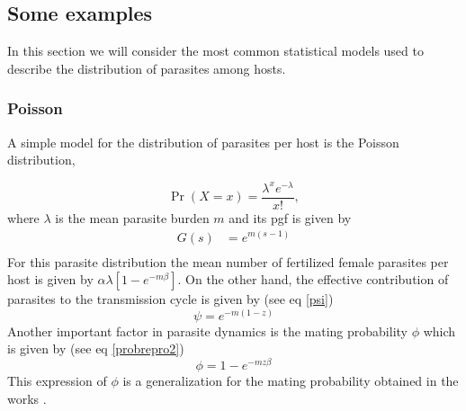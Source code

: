 \documentclass[12pt,a4paper]{article}
\theoremstyle{plain}%
\theoremstyle{definition}
\theoremstyle{remark}
\begin{document}
	
	\subsection{Some examples}\label{sec:ejemplos}
	In this section we will consider the most common statistical models used to describe the distribution of parasites among hosts.
	\subsubsection{Poisson}
	A simple model for the distribution of parasites per host \cite{lahmar2001frequency} is the Poisson distribution,
	
	\begin{equation}
	\Pr(X=x)=\frac {\lambda ^{x}e^{-\lambda }}{x!},
	\end{equation}     
	where $\lambda$ is the mean parasite burden $m$ and its pgf is given by
	\begin{equation}
	\begin{split}
	G(s)&=e^{m(s-1)}\\
	\end{split}
	\end{equation}
	For this parasite distribution the 
	mean number of fertilized female parasites per host is given by
	$\alpha \lambda \left[1  -  e^{-m\beta} \right]$.
	On the other hand, the effective contribution of parasites to the transmission cycle is given by (see eq \eqref{psi})
	\begin{equation}
	\psi=e^{-m(1-z)}
	\end{equation}
	Another important factor in parasite dynamics is the mating probability $\phi$ which is given by (see eq \ref{probrepro2})
	\begin{equation}
	\phi=
	1-e^{-mz \beta}
	\end{equation}
	This expression of $\phi$ is a generalization for the  mating probability obtained in the works \cite{anderson1992infectious,may1993biased,may1977togetherness}. 
	
\end{document}
